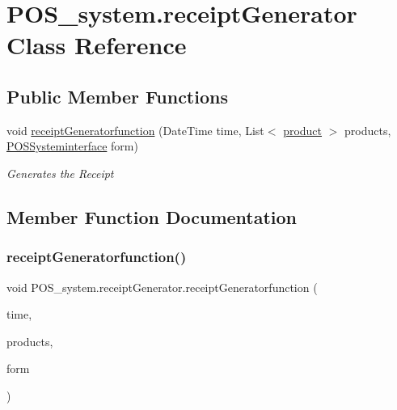 \hypertarget{class_p_o_s__system_1_1receipt_generator}{}\section{P\+O\+S\+\_\+system.\+receipt\+Generator Class Reference}
\label{class_p_o_s__system_1_1receipt_generator}
\subsection*{Public Member Functions}
\begin{DoxyCompactItemize}
\item 
void \mbox{\hyperlink{class_p_o_s__system_1_1receipt_generator_ac618bbde675e57e53361eeeeab3ed8d3}{receipt\+Generatorfunction}} (Date\+Time time, List$<$ \mbox{\hyperlink{class_p_o_s__system_1_1product}{product}} $>$ products, \mbox{\hyperlink{class_p_o_s__system_1_1_p_o_s_systeminterface}{P\+O\+S\+Systeminterface}} form)
\begin{DoxyCompactList}\small\item\em Generates the Receipt \end{DoxyCompactList}\end{DoxyCompactItemize}


\subsection{Member Function Documentation}
\mbox{\label{class_p_o_s__system_1_1receipt_generator_ac618bbde675e57e53361eeeeab3ed8d3}} 
\subsubsection{\texorpdfstring{receipt\+Generatorfunction()}{receiptGeneratorfunction()}}
{\footnotesize\ttfamily void P\+O\+S\+\_\+system.\+receipt\+Generator.\+receipt\+Generatorfunction (\begin{DoxyParamCaption}\item[{Date\+Time}]{time,  }\item[{List$<$ \mbox{\hyperlink{class_p_o_s__system_1_1product}{product}} $>$}]{products,  }\item[{\mbox{\hyperlink{class_p_o_s__system_1_1_p_o_s_systeminterface}{P\+O\+S\+Systeminterface}}}]{form }\end{DoxyParamCaption})}



